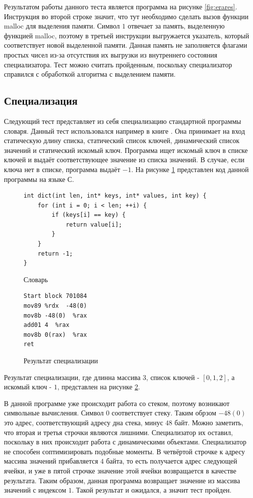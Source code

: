 Результатом работы данного теста является программа на рисунке \ref{fig:erares}.
Инструкция во второй строке значит, что тут необходимо сделать вызов функции malloc для выделения памяти. Символ $1$ отвечает за память, выделенную функцией malloc, поэтому в третьей инструкции выгружается указатель, который соответствует новой выделенной памяти. Данная память не заполняется флагами простых чисел из-за отсутствия их выгрузки из внутреннего состояния специализатора. Тест можно считать пройденным, поскольку специализатор справился с обработкой алгоритма с выделением памяти.

\subsection{ Специализация}
Следующий тест представляет из себя специализацию стандартной программы словаря. Данный тест использовался например в книге \cite{PEAPG}. Она принимает на вход статическую длину списка, статический список ключей, динамический список значений и статический искомый ключ. Программа ищет искомый ключ в списке ключей и выдаёт соответствующее значение из списка значений. В случае, если ключа нет в списке, программа выдаёт $-1$. На рисунке \ref{fig:dict} представлен код данной программы на языке С.
\begin{figure}[h]
\begin{lstlisting}[xleftmargin = 20pt]
int dict(int len, int* keys, int* values, int key) {
    for (int i = 0; i < len; ++i) {
        if (keys[i] == key) {
            return value[i];
        }
    }
    return -1;
}
\end{lstlisting}
\caption{ Словарь}
\label{fig:dict}
\end{figure}
\begin{figure}
\begin{lstlisting}[xleftmargin = 20pt]
Start block 701084
mov89 %rdx  -48(0) 
mov8b -48(0)  %rax 
add01 4  %rax 
mov8b 0(rax)  %rax 
ret
\end{lstlisting}
\caption{ Результат специализации}
\label{fig:dictres}
\end{figure}
Результат специализации, где длинна массива $3$, список ключей - $[0, 1, 2]$, а искомый ключ - $1$, представлен на рисунке \ref{fig:dictres}.

В данной программе уже происходит работа со стеком, поэтому возникают символьные вычисления. Символ $0$ соответствует стеку. Таким обрзом $-48(0)$ это адрес, соответствующий адресу дна стека, минус $48$ байт. Можно заметить, что вторая и третья строчки являются лишними. Специализатор их оставил, поскольку в них происходит работа с динамическими объектами. Специализатор не способен соптимизировать подобные моменты. В четвёртой строчке к адресу массива значений прибавляется $4$ байта, то есть получается адрес следующей ячейки, и уже в пятой строчке значение этой ячейки возвращается в качестве результата. Таким образом, данная программа возвращает значение из массива значений с индексом $1$. Такой результат и ожидался, а значит тест пройден.

